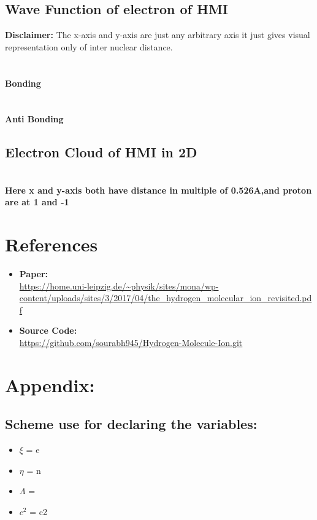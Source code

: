 \documentclass[12pt]{report}
\begin{document}
	\section{Wave Function of electron of HMI}
		\normalsize \textbf{Disclaimer:} The x-axis and y-axis are just any arbitrary axis it just gives visual representation only of inter nuclear distance. \\
		{}\\
		{}\\
		\centering \textbf{\normalsize Bonding}\\
		\vspace{-1cm}
		{}\\
		{}\\
		\centering \textbf{\normalsize Anti Bonding}
	\section{Electron Cloud of HMI in 2D}
	    {}\\
	    \centering \textbf{\normalsize Here x and y-axis both have distance in multiple of 0.526A,and proton are at 1 and -1}\\
	    
\chapter{References}
	\begin{itemize}
		\item \normalsize \textbf{Paper: \\}\url{https://home.uni-leipzig.de/~physik/sites/mona/wp-content/uploads/sites/3/2017/04/the_hydrogen_molecular_ion_revisited.pdf}
		
		\item \normalsize \textbf{Source Code: \\}\url{https://github.com/sourabh945/Hydrogen-Molecule-Ion.git}
	\end{itemize}
\chapter{Appendix:}
	\raggedright
	\section{Scheme use for declaring the variables:}
		\begin{itemize}
			\large
			\item $\xi$ = e
			\item $\eta$ = n
			\item $\Lambda$ = 
			\item $c^2$ = c2
		\end{itemize}
\end{document}
